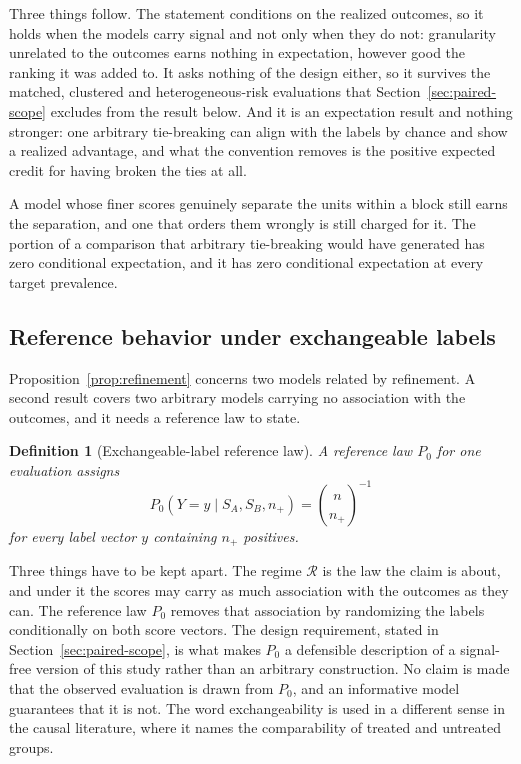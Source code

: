 \documentclass[11pt]{article}
\newcommand{\Regime}{\mathcal{R}}
\newtheorem{definition}{Definition}
\theoremstyle{remark}
\begin{document}
Three things follow. The statement conditions on the realized outcomes, so it holds when the models carry signal and not only when they do not: granularity unrelated to the outcomes earns nothing in expectation, however good the ranking it was added to. It asks nothing of the design either, so it survives the matched, clustered and heterogeneous-risk evaluations that Section~\ref{sec:paired-scope} excludes from the result below. And it is an expectation result and nothing stronger: one arbitrary tie-breaking can align with the labels by chance and show a realized advantage, and what the convention removes is the positive expected credit for having broken the ties at all.

A model whose finer scores genuinely separate the units within a block still earns the separation, and one that orders them wrongly is still charged for it. The portion of a comparison that arbitrary tie-breaking would have generated has zero conditional expectation, and it has zero conditional expectation at every target prevalence.

\subsection{Reference behavior under exchangeable labels}
\label{sec:reference-law}

Proposition~\ref{prop:refinement} concerns two models related by refinement. A second result covers two arbitrary models carrying no association with the outcomes, and it needs a reference law to state.

\begin{definition}[Exchangeable-label reference law]
\label{def:label-condition}
A reference law $P_0$ for one evaluation assigns
\[
P_0\left(Y=y\mid S_A,S_B,n_+\right)
=
\binom{n}{n_+}^{-1}
\]
for every label vector $y$ containing $n_+$ positives.
\end{definition}

Three things have to be kept apart. The regime $\Regime$ is the law the claim is about, and under it the scores may carry as much association with the outcomes as they can. The reference law $P_0$ removes that association by randomizing the labels conditionally on both score vectors. The design requirement, stated in Section~\ref{sec:paired-scope}, is what makes $P_0$ a defensible description of a signal-free version of this study rather than an arbitrary construction. No claim is made that the observed evaluation is drawn from $P_0$, and an informative model guarantees that it is not. The word exchangeability is used in a different sense in the causal literature, where it names the comparability of treated and untreated groups.
\end{document}
